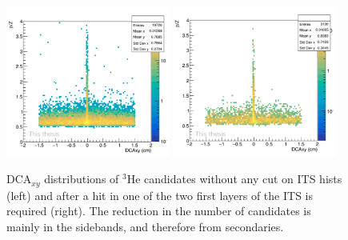 \begin{figure}
    \centering
    \includegraphics[width=0.48\textwidth]{figures/DCA_dist_3he_no_cut.png}
    \includegraphics[width=0.48\textwidth]{figures/DCA_dist_3he_ITSNClusters_cut.png}
    \caption{DCA$_{xy}$ distributions of $^3\mathrm{He}$ candidates without any cut on ITS hists (left) and after a hit in one of the two first layers of the ITS is required (right). The reduction in the number of candidates is mainly in the sidebands, and therefore from secondaries.}
    \label{fig:DCA_dist_ITS_cut_effect}
\end{figure}
